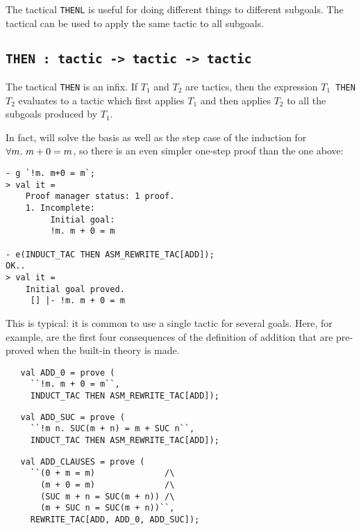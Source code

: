 The tactical {\small\verb|THENL|} is useful for doing different things
to different subgoals. The tactical  can be used to apply the
same tactic to all subgoals.

\subsection{\tt THEN : tactic -> tactic -> tactic}\label{THEN}

The tactical {\small\verb|THEN|} is an \ML{} infix. If $T_1$ and $T_2$
are tactics, then the \ML{} expression $T_1${\small\verb| THEN |}$T_2$
evaluates to a tactic which first applies $T_1$ and then applies $T_2$
to all the subgoals produced by $T_1$.

In fact,  will solve the basis as well as
the step case of the induction for $\forall m.\ m+0=m$, so there is an
even simpler one-step proof than the one above:
\setcounter{sessioncount}{0}
\begin{session}\begin{verbatim}
- g `!m. m+0 = m`;
> val it =
    Proof manager status: 1 proof.
    1. Incomplete:
         Initial goal:
         !m. m + 0 = m

- e(INDUCT_TAC THEN ASM_REWRITE_TAC[ADD]);
OK..
> val it =
    Initial goal proved.
     [] |- !m. m + 0 = m
\end{verbatim}\end{session}

\noindent This is typical: it is common to use a single tactic for several
goals. Here, for example, are the first four consequences of the
definition  of addition that are pre-proved when the built-in
theory  \HOL{} is made.

\begin{hol}\begin{verbatim}
   val ADD_0 = prove (
     ``!m. m + 0 = m``,
     INDUCT_TAC THEN ASM_REWRITE_TAC[ADD]);
\end{verbatim}\end{hol}

\begin{hol}\begin{verbatim}
   val ADD_SUC = prove (
     ``!m n. SUC(m + n) = m + SUC n``,
     INDUCT_TAC THEN ASM_REWRITE_TAC[ADD]);
\end{verbatim}\end{hol}

\begin{hol}\begin{verbatim}
   val ADD_CLAUSES = prove (
     ``(0 + m = m)              /\
       (m + 0 = m)              /\
       (SUC m + n = SUC(m + n)) /\
       (m + SUC n = SUC(m + n))``,
     REWRITE_TAC[ADD, ADD_0, ADD_SUC]);
\end{verbatim}\end{hol}


